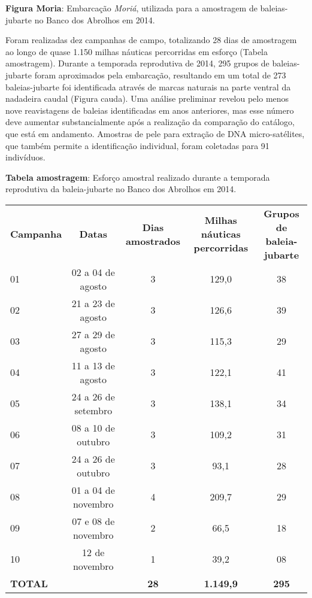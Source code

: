\textbf{Figura Moria}: Embarcação \textit{Moriá}, utilizada para a amostragem de baleias-jubarte no Banco dos Abrolhos em 2014.

Foram realizadas dez campanhas de campo, totalizando 28 dias de amostragem ao longo de quase 1.150 milhas náuticas percorridas em esforço (Tabela amostragem). Durante a temporada reprodutiva de 2014, 295 grupos de baleias-jubarte foram aproximados pela embarcação, resultando em um total de 273 baleias-jubarte foi identificada através de marcas naturais na parte ventral da nadadeira caudal (Figura cauda). Uma análise preliminar revelou pelo menos nove reavistagens de baleias identificadas em anos anteriores, mas esse número deve aumentar substancialmente após a realização da comparação do catálogo, que está em andamento. Amostras de pele para extração de DNA micro-satélites, que também permite a identificação individual, foram coletadas para 91 indivíduos.

\textbf{Tabela amostragem}: Esforço amostral realizado durante a temporada reprodutiva da baleia-jubarte no Banco dos Abrolhos em 2014.  

\begin{tabular}{lcccc}  
\textbf{Campanha} & \textbf{Datas} & \textbf{Dias amostrados} & \textbf{Milhas náuticas percorridas} & \textbf{Grupos de baleia-jubarte} \\
01 & 02 a 04 de agosto & 3 & 129,0 & 38 \\
02 & 21 a 23 de agosto & 3 & 126,6 & 39 \\
03 & 27 a 29 de agosto & 3 & 115,3 & 29 \\
04 & 11 a 13 de agosto & 3 & 122,1 & 41 \\
05 & 24 a 26 de setembro & 3 & 138,1 & 34 \\
06 & 08 a 10 de outubro & 3 & 109,2 & 31 \\
07 & 24 a 26 de outubro & 3 & 93,1 & 28 \\
08 & 01 a 04 de novembro & 4 & 209,7 & 29 \\
09 & 07 e 08 de novembro & 2 & 66,5 & 18 \\
10 & 12 de novembro & 1 & 39,2 & 08 \\
\textbf{TOTAL} & & \textbf{28} & \textbf{1.149,9} & \textbf{295} \\
\end{tabular}    
